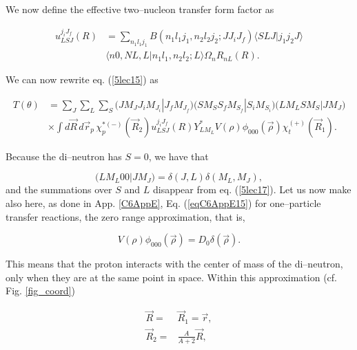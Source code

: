 \begin{subappendices}
We now define the effective two--nucleon transfer  form factor as


\begin{equation}\label{eqC7B15}
\begin{split}
u^{j_i J_f}_{LSJ}(R)&=\sum_{n_1l_1j_1} B(n_1 l_1 j_1,n_2 l_2 j_2;JJ_i J_f) \langle S L J|j_1 j_2 J\rangle\\
&\langle n0,NL,L|n_1 l_1,n_2 l_2;L \rangle \Omega_n R_{nL}(R).
\end{split}
\end{equation}

We can now rewrite eq. (\ref{5lec15}) as


\begin{equation}\label{5lec17}
\begin{split}
T(\theta)&= \sum_J\sum_L\sum_S \bigl( J M_J J_i M_{J_i}|J_f M_{J_f} \bigr) \bigl( S M_S S_f M_{S_f}|S_i M_{S_i}\bigr)
 \bigl( L M_L S M_{S}|J M_{J} \bigr) \\
&\times \int d\vec R\,d\vec r_p\, \chi^{*(-)}_p(\vec R_2)
 u^{j_i J_f}_{LSJ}(R) Y_{L M_L}^*V(\rho) \phi_{000}(\vec \rho) \chi^{(+)}_t(\vec R_1).
\end{split}
\end{equation}

Because the di--neutron has $S=0$, we have that


\begin{equation}\label{5lec18}
 \bigl( L M_L 0 0|J M_{J} \bigr)=\delta(J,L)\delta(M_L,M_J),
\end{equation}
and the summations over $S$ and $L$ disappear from eq. (\ref{5lec17}). Let us now  make also here, as done in App. \ref{C6AppE}, Eq. (\ref{eqC6AppE15}) for one--particle transfer reactions, the zero range approximation, that is,


\begin{equation}\label{5lec19}
V(\rho) \phi_{000}(\vec \rho)=D_0 \delta(\vec \rho).
\end{equation}

This means that the proton interacts with the center of mass of the di--neutron, only when they are at the same point in space.
Within this approximation (cf. Fig. \ref{fig_coord})


\begin{equation}\label{5lec20}
\begin{split}
\vec R=&\vec R_1=\vec r,\\
\vec R_2=&\frac{A}{A+2}\vec R,
\end{split}
\end{equation}


\end{subappendices}
